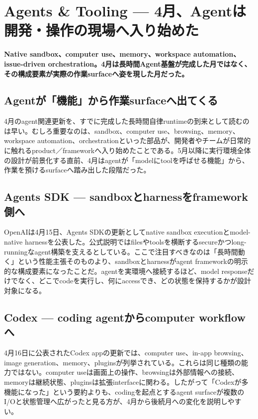 \section{Agents \& Tooling — 4月、Agentは開発・操作の現場へ入り始めた}
\noindent\textbf{Native sandbox、computer use、memory、workspace automation、issue-driven orchestration。4月は長時間Agent基盤が完成した月ではなく、その構成要素が実際の作業surfaceへ姿を現した月だった。}\autocite{src-1ecdad90bfb4,src-20e34cbfb714,src-c71ef79e3212,src-f9ff221789e0}

\subsection{Agentが「機能」から作業surfaceへ出てくる}

4月のagent関連更新を、すでに完成した長時間自律runtimeの到来として読むのは早い。むしろ重要なのは、sandbox、computer use、browsing、memory、workspace automation、orchestrationといった部品が、開発者やチームが日常的に触れるproduct／frameworkへ入り始めたことである。5月以降に実行環境全体の設計が前景化する直前、4月はagentが「modelにtoolを呼ばせる機能」から、作業を預けるsurfaceへ踏み出した段階だった。\autocite{src-1ecdad90bfb4,src-20e34cbfb714,src-c71ef79e3212,src-f9ff221789e0}


\subsection{Agents SDK — sandboxとharnessをframework側へ}

OpenAIは4月15日、Agents SDKの更新としてnative sandbox executionとmodel-native harnessを公表した。公式説明ではfilesやtoolsを横断するsecureかつlong-runningなagent構築を支えるとしている。ここで注目すべきなのは「長時間動く」という性能主張そのものより、sandboxとharnessがagent frameworkの明示的な構成要素になったことだ。agentを実環境へ接続するほど、model responseだけでなく、どこでcodeを実行し、何にaccessでき、どの状態を保持するかが設計対象になる。\autocite{src-1ecdad90bfb4}


\subsection{Codex — coding agentからcomputer workflowへ}

4月16日に公表されたCodex appの更新では、computer use、in-app browsing、image generation、memory、pluginsが列挙されている。これらは同じ種類の能力ではない。computer useは画面上の操作、browsingは外部情報への接続、memoryは継続状態、pluginsは拡張interfaceに関わる。したがって「Codexが多機能になった」という要約よりも、codingを起点とするagent surfaceが複数のI/Oと状態管理へ広がったと見る方が、4月から後続月への変化を説明しやすい。\autocite{src-20e34cbfb714}



